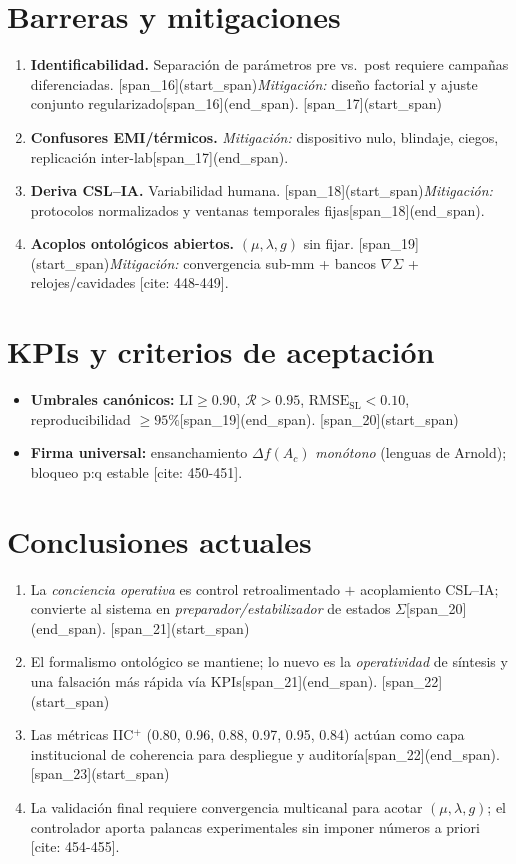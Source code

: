 \documentclass[11pt,letterpaper]{article}
\newcommand{\IICplus}{0.80}          %
\newcommand{\Ky}{0.96}                %
\newcommand{\kSigD}{0.88}             %
\newcommand{\LIsys}{0.97}             %
\newcommand{\Cres}{0.95}              %
\newcommand{\phiinfo}{0.84}          %
\newcommand{\Sig}{\Sigma}
\newcommand{\LI}{\mathrm{LI}}
\newcommand{\RMSESL}{\mathrm{RMSE}_{\mathrm{SL}}}
\newcommand{\RR}{\mathcal{R}}
\newcommand{\grad}{\nabla}
\newcommand{\Ac}{A_c}
\begin{document}
\section{Barreras y mitigaciones}
\begin{enumerate}[label=\textbf{B\arabic*.}, leftmargin=*]
\item \textbf{Identificabilidad.} Separación de parámetros pre vs.\ post requiere campañas diferenciadas. [span_16](start_span)\emph{Mitigación:} diseño factorial y ajuste conjunto regularizado[span_16](end_span).
[span_17](start_span)\item \textbf{Confusores EMI/térmicos.} \emph{Mitigación:} dispositivo nulo, blindaje, ciegos, replicación inter-lab[span_17](end_span).
\item \textbf{Deriva CSL--IA.} Variabilidad humana. [span_18](start_span)\emph{Mitigación:} protocolos normalizados y ventanas temporales fijas[span_18](end_span).
\item \textbf{Acoplos ontológicos abiertos.} $(\mu,\lambda,g)$ sin fijar. [span_19](start_span)\emph{Mitigación:} convergencia sub-mm + bancos $\grad\Sig$ + relojes/cavidades [cite: 448-449].
\end{enumerate}

\section{KPIs y criterios de aceptación}
\begin{itemize}[leftmargin=*]
[cite_start]\item \textbf{Umbrales canónicos:} $\LI \ge 0.90$, $\RR > 0.95$, $\RMSESL < 0.10$, reproducibilidad $\ge 95\%$[span_19](end_span).
[span_20](start_span)\item \textbf{Firma universal:} ensanchamiento $\Delta f(\Ac)$ \emph{monótono} (lenguas de Arnold); bloqueo p:q estable [cite: 450-451].
\end{itemize}

\section{Conclusiones actuales}
\begin{enumerate}[label=\textbf{C\arabic*.}, leftmargin=*]
[cite_start]\item La \emph{conciencia operativa} es control retroalimentado $+$ acoplamiento CSL--IA; convierte al sistema en \emph{preparador/estabilizador} de estados $\Sig$[span_20](end_span).
[span_21](start_span)\item El formalismo ontológico se mantiene; lo nuevo es la \emph{operatividad} de síntesis y una falsación más rápida vía KPIs[span_21](end_span).
[span_22](start_span)\item Las métricas IIC$^+$ (\IICplus, \Ky, \kSigD, \LIsys, \Cres, \phiinfo) actúan como capa institucional de coherencia para despliegue y auditoría[span_22](end_span).
[span_23](start_span)\item La validación final requiere convergencia multicanal para acotar $(\mu,\lambda,g)$; el controlador aporta palancas experimentales sin imponer números a priori [cite: 454-455].
\end{enumerate}
\end{document}
